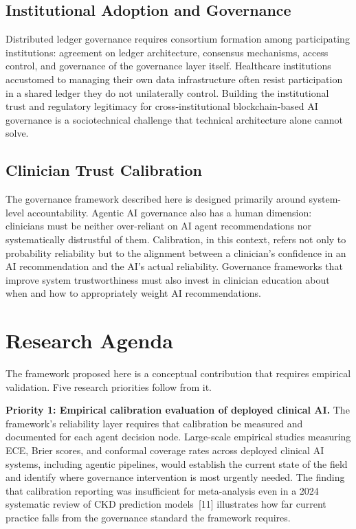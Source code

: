 \documentclass[11pt]{article}
\begin{document}
\subsection{Institutional Adoption and
Governance}\label{institutional-adoption-and-governance}

Distributed ledger governance requires consortium formation among
participating institutions: agreement on ledger architecture, consensus
mechanisms, access control, and governance of the governance layer
itself. Healthcare institutions accustomed to managing their own data
infrastructure often resist participation in a shared ledger they do not
unilaterally control. Building the institutional trust and regulatory
legitimacy for cross-institutional blockchain-based AI governance is a
sociotechnical challenge that technical architecture alone cannot solve.

\subsection{Clinician Trust
Calibration}\label{clinician-trust-calibration}

The governance framework described here is designed primarily around
system-level accountability. Agentic AI governance also has a human
dimension: clinicians must be neither over-reliant on AI agent
recommendations nor systematically distrustful of them. Calibration, in
this context, refers not only to probability reliability but to the
alignment between a clinician's confidence in an AI recommendation and
the AI's actual reliability. Governance frameworks that improve system
trustworthiness must also invest in clinician education about when and
how to appropriately weight AI recommendations.


\section{Research Agenda}\label{research-agenda}

The framework proposed here is a conceptual contribution that requires
empirical validation. Five research priorities follow from it.

\textbf{Priority 1: Empirical calibration evaluation of deployed
clinical AI.} The framework's reliability layer requires that
calibration be measured and documented for each agent decision node.
Large-scale empirical studies measuring ECE, Brier scores, and conformal
coverage rates across deployed clinical AI systems, including agentic
pipelines, would establish the current state of the field and identify
where governance intervention is most urgently needed. The finding that
calibration reporting was insufficient for meta-analysis even in a 2024
systematic review of CKD prediction models~{[}11{]} illustrates how far
current practice falls from the governance standard the framework
requires.
\end{document}
